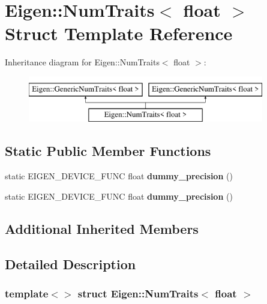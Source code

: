 \hypertarget{struct_eigen_1_1_num_traits_3_01float_01_4}{}\section{Eigen\+:\+:Num\+Traits$<$ float $>$ Struct Template Reference}
\label{struct_eigen_1_1_num_traits_3_01float_01_4}
Inheritance diagram for Eigen\+:\+:Num\+Traits$<$ float $>$\+:\begin{figure}[H]
\begin{center}
\leavevmode
\includegraphics[height=2.000000cm]{struct_eigen_1_1_num_traits_3_01float_01_4}
\end{center}
\end{figure}
\subsection*{Static Public Member Functions}
\begin{DoxyCompactItemize}
\item 
\mbox{\label{struct_eigen_1_1_num_traits_3_01float_01_4_a9257602903a4e9bd9f201cf9f9c098fe}} 
static E\+I\+G\+E\+N\+\_\+\+D\+E\+V\+I\+C\+E\+\_\+\+F\+U\+NC float {\bfseries dummy\+\_\+precision} ()
\item 
\mbox{\label{struct_eigen_1_1_num_traits_3_01float_01_4_a9257602903a4e9bd9f201cf9f9c098fe}} 
static E\+I\+G\+E\+N\+\_\+\+D\+E\+V\+I\+C\+E\+\_\+\+F\+U\+NC float {\bfseries dummy\+\_\+precision} ()
\end{DoxyCompactItemize}
\subsection*{Additional Inherited Members}


\subsection{Detailed Description}
\subsubsection*{template$<$$>$\newline
struct Eigen\+::\+Num\+Traits$<$ float $>$}



